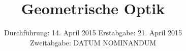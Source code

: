 
\subject{Anfängerpraktikum V408}
\title{Geometrische Optik}
\date{
  Durchführung: 14. April 2015
  \hspace{1em}
  Erstabgabe: 21. April 2015\\
  Zweitabgabe: DATUM NOMINANDUM}


\maketitle
\thispagestyle{empty}
\newpage





\printbibliography


